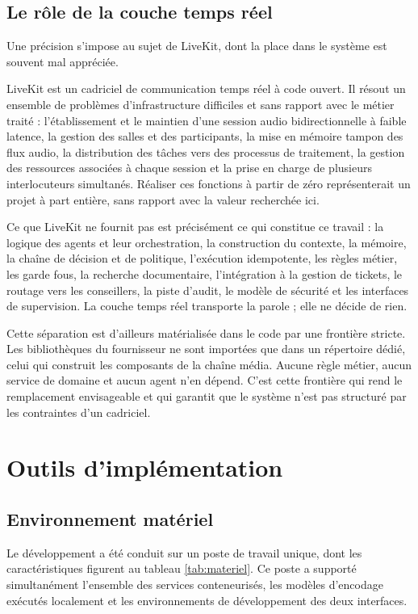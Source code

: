 \subsection{Le rôle de la couche temps réel}

Une précision s'impose au sujet de LiveKit, dont la place dans le système est souvent mal appréciée.

LiveKit est un cadriciel de communication temps réel à code ouvert. Il résout un ensemble de problèmes d'infrastructure difficiles et sans rapport avec le métier traité : l'établissement et le maintien d'une session audio bidirectionnelle à faible latence, la gestion des salles et des participants, la mise en mémoire tampon des flux audio, la distribution des tâches vers des processus de traitement, la gestion des ressources associées à chaque session et la prise en charge de plusieurs interlocuteurs simultanés. Réaliser ces fonctions à partir de zéro représenterait un projet à part entière, sans rapport avec la valeur recherchée ici.

Ce que LiveKit ne fournit pas est précisément ce qui constitue ce travail : la logique des agents et leur orchestration, la construction du contexte, la mémoire, la chaîne de décision et de politique, l'exécution idempotente, les règles métier, les garde fous, la recherche documentaire, l'intégration à la gestion de tickets, le routage vers les conseillers, la piste d'audit, le modèle de sécurité et les interfaces de supervision. La couche temps réel transporte la parole ; elle ne décide de rien.

Cette séparation est d'ailleurs matérialisée dans le code par une frontière stricte. Les bibliothèques du fournisseur ne sont importées que dans un répertoire dédié, celui qui construit les composants de la chaîne média. Aucune règle métier, aucun service de domaine et aucun agent n'en dépend. C'est cette frontière qui rend le remplacement envisageable et qui garantit que le système n'est pas structuré par les contraintes d'un cadriciel.

\section{Outils d'implémentation}

\subsection{Environnement matériel}

Le développement a été conduit sur un poste de travail unique, dont les caractéristiques figurent au tableau \ref{tab:materiel}. Ce poste a supporté simultanément l'ensemble des services conteneurisés, les modèles d'encodage exécutés localement et les environnements de développement des deux interfaces.


